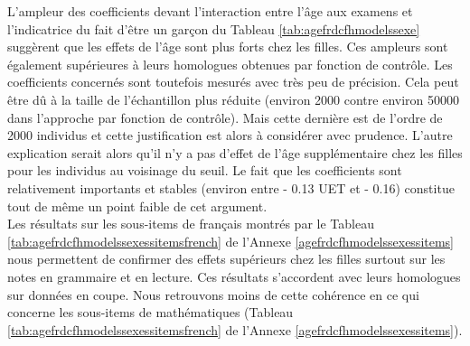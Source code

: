 \documentclass[
]{book}
\begin{document}
\quad L'ampleur des coefficients devant l'interaction entre l'âge aux examens et l'indicatrice du fait d'être un garçon du Tableau \ref{tab:agefrdcfhmodelssexe} suggèrent que les effets de l'âge sont plus forts chez les filles. Ces ampleurs sont également supérieures à leurs homologues obtenues par fonction de contrôle. Les coefficients concernés sont toutefois mesurés avec très peu de précision. Cela peut être dû à la taille de l'échantillon plus réduite (environ 2000 contre environ 50000 dans l'approche par fonction de contrôle). Mais cette dernière est de l'ordre de 2000 individus et cette justification est alors à considérer avec prudence. L'autre explication serait alors qu'il n'y a pas d'effet de l'âge supplémentaire chez les filles pour les individus au voisinage du seuil. Le fait que les coefficients sont relativement importants et stables (environ entre - 0.13 UET et - 0.16) constitue tout de même un point faible de cet argument.\\
Les résultats sur les sous-items de français montrés par le Tableau \ref{tab:agefrdcfhmodelssexessitemsfrench} de l'Annexe \ref{agefrdcfhmodelssexessitems} nous permettent de confirmer des effets supérieurs chez les filles surtout sur les notes en grammaire et en lecture. Ces résultats s'accordent avec leurs homologues sur données en coupe. Nous retrouvons moins de cette cohérence en ce qui concerne les sous-items de mathématiques (Tableau \ref{tab:agefrdcfhmodelssexessitemsfrench} de l'Annexe \ref{agefrdcfhmodelssexessitems}).

\begingroup\fontsize{8}{10}\selectfont
\end{document}
